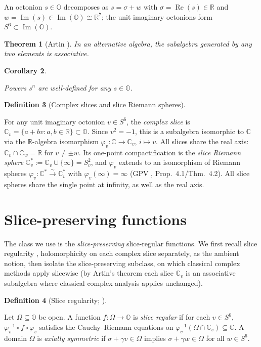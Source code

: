 \documentclass[11pt]{article}
\newcommand{\OO}{\mathbb{O}}
\newcommand{\CC}{\mathbb{C}}
\newcommand{\RR}{\mathbb{R}}
\newcommand{\Cstar}{\CC^{*}}
\DeclareMathOperator{\re}{Re}
\DeclareMathOperator{\im}{Im}
\providecommand{\lean}[1]{}
\providecommand{\uses}[1]{}
\theoremstyle{plain}
\newtheorem{theorem}{Theorem}[section]
\newtheorem{corollary}[theorem]{Corollary}
\theoremstyle{definition}
\newtheorem{definition}[theorem]{Definition}
\theoremstyle{remark}
\begin{document}
An octonion $s\in\OO$ decomposes as $s=\sigma+w$ with $\sigma=\re(s)\in\RR$ and
$w=\im(s)\in\im(\OO)\cong\RR^7$; the unit imaginary octonions form $S^6\subset\im(\OO)$.

\begin{theorem}[Artin \cite{Schafer66}]\label{thm:artin}
In an alternative algebra, the subalgebra generated by any two elements is
associative.
\end{theorem}

\begin{corollary}\label{cor:powers}
\uses{thm:artin}
Powers $s^n$ are well-defined for any $s\in\OO$.
\end{corollary}

\begin{definition}[Complex slices and slice Riemann spheres]\label{def:slices}
\lean{Octonion.unitImaginarySphere, Octonion.sliceEmbed,
Octonion.sliceEmbed_mul, Octonion.sliceSphere}
\uses{def:octonions}
For any unit imaginary octonion $v\in S^6$, the \emph{complex slice} is
$\CC_v=\{a+bv:a,b\in\RR\}\subset\OO$. Since $v^2=-1$, this is a subalgebra isomorphic to
$\CC$ via the $\RR$-algebra isomorphism $\varphi_v:\CC\to\CC_v$, $i\mapsto v$. All slices
share the real axis: $\CC_v\cap\CC_w=\RR$ for $v\neq\pm w$. Its one-point compactification
is the \emph{slice Riemann sphere} $\CC_v^{*}:=\CC_v\cup\{\infty\}=S^2_v$, and $\varphi_v$
extends to an isomorphism of Riemann spheres $\varphi_v:\Cstar\xrightarrow{\sim}\CC_v^{*}$
with $\varphi_v(\infty)=\infty$ (GPV \cite{VS}, Prop.~4.1/Thm.~4.2). All slice spheres
share the single point at infinity, as well as the real axis.
\end{definition}

\section{Slice-preserving functions}
The class we use is the \emph{slice-preserving} slice-regular functions. We first recall slice
regularity \cite{GS07,GP11,CSS12,GSS13}, holomorphicity on each complex slice separately, as
the ambient notion, then isolate the slice-preserving subclass, on which classical complex methods
apply slicewise (by Artin's theorem each slice $\CC_v$ is an associative subalgebra where classical
complex analysis applies unchanged).

\begin{definition}[Slice regularity; {\cite[Def.~5.1.1]{CSS12}}]\label{def:slice-regular}
\uses{def:slices}
Let $\Omega\subseteq\OO$ be open. A function $f:\Omega\to\OO$ is \emph{slice regular}
if for each $v\in S^6$, $\varphi_v^{-1}\circ f\circ\varphi_v$ satisfies the
Cauchy--Riemann equations on $\varphi_v^{-1}(\Omega\cap\CC_v)\subseteq\CC$. A domain
$\Omega$ is \emph{axially symmetric} if $\sigma+\gamma v\in\Omega$ implies
$\sigma+\gamma w\in\Omega$ for all $w\in S^6$.
\end{definition}
\end{document}
